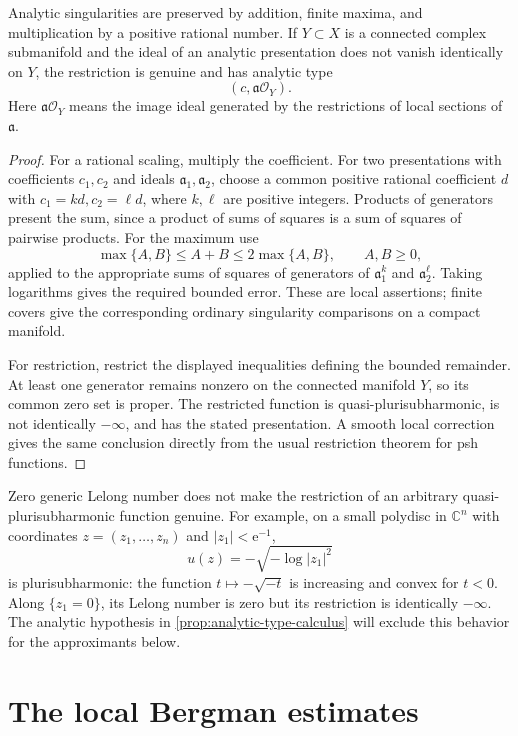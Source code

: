 \begin{proposition}\label{prop:analytic-type-calculus}
Analytic singularities are preserved by addition, finite maxima, and multiplication by a positive rational number. If $Y\subset X$ is a connected complex submanifold and the ideal of an analytic presentation does not vanish identically on $Y$, the restriction is genuine and has analytic type
\[
 (c,\mathfrak a\mathcal O_Y).
\]
Here $\mathfrak a\mathcal O_Y$ means the image ideal generated by the restrictions of local sections of $\mathfrak a$.
\end{proposition}
\begin{proof}
For a rational scaling, multiply the coefficient. For two presentations with coefficients $c_1,c_2$ and ideals $\mathfrak a_1,\mathfrak a_2$, choose a common positive rational coefficient $d$ with $c_1=k d,c_2=\ell d$, where $k,\ell$ are positive integers. Products of generators present the sum, since a product of sums of squares is a sum of squares of pairwise products. For the maximum use
\[
 \max\{A,B\}\leq A+B\leq2\max\{A,B\},\qquad A,B\geq0,
\]
applied to the appropriate sums of squares of generators of $\mathfrak a_1^k$ and $\mathfrak a_2^\ell$. Taking logarithms gives the required bounded error. These are local assertions; finite covers give the corresponding ordinary singularity comparisons on a compact manifold.

For restriction, restrict the displayed inequalities defining the bounded remainder. At least one generator remains nonzero on the connected manifold $Y$, so its common zero set is proper. The restricted function is quasi-plurisubharmonic, is not identically $-\infty$, and has the stated presentation. A smooth local correction gives the same conclusion directly from the usual restriction theorem for psh functions.
\end{proof}

Zero generic Lelong number does not make the restriction of an arbitrary quasi-plurisubharmonic function genuine. For example, on a small polydisc in $\mathbb C^n$ with coordinates $z=(z_1,\ldots,z_n)$ and $|z_1|<\mathrm{e}^{-1}$,
\[
 u(z)=-\sqrt{-\log|z_1|^2}
\]
is plurisubharmonic: the function $t\mapsto-\sqrt{-t}$ is increasing and convex for $t<0$. Along $\{z_1=0\}$, its Lelong number is zero but its restriction is identically $-\infty$. The analytic hypothesis in \cref{prop:analytic-type-calculus} will exclude this behavior for the approximants below.

\section{The local Bergman estimates}

